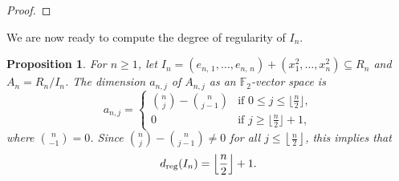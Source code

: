 \documentclass[11pt]{article}
\newcommand{\F}[0]{\mathbb{F}}
\newcommand{\es}[2]{e_{#1,\, #2}}
\DeclarePairedDelimiter{\fl}{\lfloor}{\rfloor}
\theoremstyle{plain}
\newtheorem{prop}[theo]{Proposition}
\theoremstyle{definition}
\theoremstyle{remark}
\begin{document}
\begin{proof}
\end{proof}

We are now ready to compute the degree of regularity of $I_n$.

\begin{prop}\label{prop:dregIn}
    For $n\geq1$, let $I_n=(\es{n}{1},\dots,\es{n}{n})+(x_1^2,\dots,x_n^2)\subseteq R_n$ and $A_n=R_n/I_n$. The dimension $a_{n,j}$ of $A_{n,j}$ as an $\F_2$-vector space is
    \begin{equation*}
        a_{n,j}=\begin{cases}
            \binom{n}{j}-\binom{n}{j-1} & \text{if }0\leq j\leq\lfloor\frac{n}{2}\rfloor,\\
            0 & \text{if }j\geq\lfloor\frac{n}{2}\rfloor+1,
        \end{cases}
    \end{equation*}
    where $\binom{n}{-1}=0$. Since $\binom{n}{j}-\binom{n}{j-1}\neq 0$ for all $j\leq\left\lfloor\frac{n}{2}\right\rfloor$, this implies that
    \begin{equation*}
        d_{\operatorname{reg}}(I_n)=\fl*{\frac{n}{2}}+1.
    \end{equation*}
\end{prop}
\end{document}
